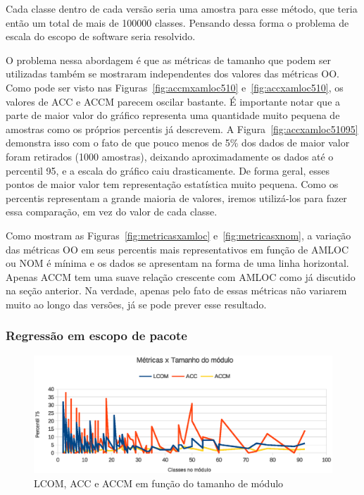 Cada classe dentro de cada versão seria uma amostra para esse método, que teria então um total de mais de 100000 classes. Pensando dessa forma o problema de escala do escopo de software seria resolvido.

O problema nessa abordagem é que as métricas de tamanho que podem ser utilizadas também se mostraram independentes dos valores das métricas OO. Como pode ser visto nas Figuras~\ref{fig:accmxamloc510} e~\ref{fig:accxamloc510}, os valores de ACC e ACCM parecem oscilar bastante. É importante notar que a parte de maior valor do gráfico representa uma quantidade muito pequena de amostras como os próprios percentis já descrevem. A Figura~\ref{fig:accxamloc51095} demonstra isso com o fato de que pouco menos de 5\% dos dados de maior valor foram retirados (1000 amostras), deixando aproximadamente os dados até o percentil 95, e a escala do gráfico caiu drasticamente. De forma geral, esses pontos de maior valor tem representação estatística muito pequena. Como os percentis representam a grande maioria de valores, iremos utilizá-los para fazer essa comparação, em vez do valor de cada classe.

Como mostram as Figuras~\ref{fig:metricasxamloc} e~\ref{fig:metricasxnom}, a variação das métricas OO em seus percentis mais representativos em função de AMLOC ou NOM é mínima e os dados se apresentam na forma de uma linha horizontal. Apenas ACCM tem uma suave relação crescente com AMLOC como já discutido na seção anterior. Na verdade, apenas pelo fato de essas métricas não variarem muito ao longo das versões, já se pode prever esse resultado.

\subsubsection{Regressão em escopo de pacote}

\begin{figure}[!htb]
\centering
\includegraphics [keepaspectratio=true,scale=0.7]{figuras/metricasxtamanhomodulo.eps}
\caption{LCOM, ACC e ACCM em função do tamanho de módulo}
\label{fig:metricasxtamanhomodulo}
\end{figure}

